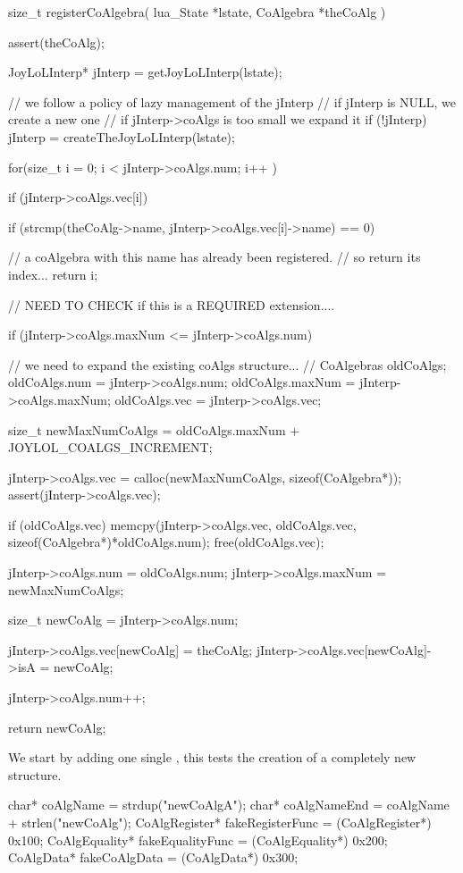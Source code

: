\startCCode
size_t registerCoAlgebra(
  lua_State *lstate,
  CoAlgebra *theCoAlg
) {
  assert(theCoAlg);
  
  JoyLoLInterp* jInterp = getJoyLoLInterp(lstate);
  
  // we follow a policy of lazy management of the jInterp
  // if jInterp is NULL, we create a new one
  // if jInterp->coAlgs is too small we expand it
  if (!jInterp) {
    jInterp = createTheJoyLoLInterp(lstate);
  }

  for(size_t i = 0; i < jInterp->coAlgs.num; i++ ) {
    if (jInterp->coAlgs.vec[i]) {
      if (strcmp(theCoAlg->name,
        jInterp->coAlgs.vec[i]->name) == 0) {
    
        // a coAlgebra with this name has already been registered. 
        // so return its index...
        return i;
      }
    }
  }
  // NEED TO CHECK if this is a REQUIRED extension....
  
  if (jInterp->coAlgs.maxNum <= jInterp->coAlgs.num) {
    // we need to expand the existing coAlgs structure...
    //  
    CoAlgebras oldCoAlgs;
    oldCoAlgs.num    = jInterp->coAlgs.num;
    oldCoAlgs.maxNum = jInterp->coAlgs.maxNum;
    oldCoAlgs.vec    = jInterp->coAlgs.vec;
    
    size_t newMaxNumCoAlgs =
      oldCoAlgs.maxNum + JOYLOL_COALGS_INCREMENT;

    jInterp->coAlgs.vec =
      calloc(newMaxNumCoAlgs, sizeof(CoAlgebra*));
    assert(jInterp->coAlgs.vec);
    
    if (oldCoAlgs.vec) {
      memcpy(jInterp->coAlgs.vec,
        oldCoAlgs.vec,
        sizeof(CoAlgebra*)*oldCoAlgs.num);
      free(oldCoAlgs.vec);
    }
    
    jInterp->coAlgs.num    = oldCoAlgs.num;
    jInterp->coAlgs.maxNum = newMaxNumCoAlgs;
  }
  
  size_t newCoAlg = jInterp->coAlgs.num;
  
  jInterp->coAlgs.vec[newCoAlg]      = theCoAlg;
  jInterp->coAlgs.vec[newCoAlg]->isA = newCoAlg;
  
  jInterp->coAlgs.num++;
  
  return newCoAlg;
}
\stopCCode


We start by adding one single , this tests the creation of 
a completely new  structure. 

\startCTest
  char*          coAlgName        = strdup("newCoAlgA");
  char*          coAlgNameEnd     = coAlgName + strlen("newCoAlg");
  CoAlgRegister* fakeRegisterFunc = (CoAlgRegister*) 0x100;
  CoAlgEquality* fakeEqualityFunc = (CoAlgEquality*) 0x200;
  CoAlgData*     fakeCoAlgData    = (CoAlgData*)     0x300;
  
